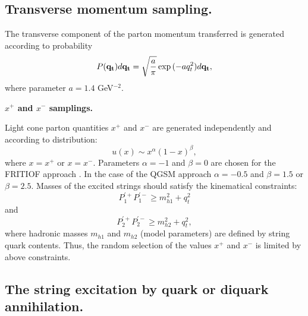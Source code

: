 \subsection{Transverse momentum sampling.}

\hspace{1.0em}The transverse component of the parton momentum
transferred is generated according to probability
\begin{equation}
\label{LSE4}P({\bf q_t})d{\bf q_t} = 
\sqrt{\frac{a}{\pi}} \exp{(-aq^2_t)}d{\bf q_t},
\end{equation}
where  parameter $a = 1.4$ GeV$^{-2}$.

{\bf $x^{+}$ and $x^{-}$ samplings.}

Light cone parton quantities $x^{+}$ and $x^{-}$ are generated
independently and according to distribution:
\begin{equation}
\label{LSE5} u(x) \sim x^{\alpha}(1 - x)^{\beta},
\end{equation}
where $x=x^{+}$ or $x=x^{-}$.
Parameters $\alpha =-1$ and $\beta = 0$ are chosen for the FRITIOF approach 
\cite{FRITIOF87}. In the case of the QGSM approach \cite{Am86} $\alpha = -0.5$ 
and $\beta = 1.5$ or $\beta = 2.5$.  Masses of the excited strings
should satisfy the kinematical constraints:
\begin{equation}
\label{LSE6} P^{\prime +}_1 P^{\prime -}_1 \geq m^2_{h1} + q^2_t
\end{equation}
and
\begin{equation}
\label{LSE7} P^{\prime +}_2 P^{\prime -}_2 \geq m^2_{h2} + q^2_t,
\end{equation}
where hadronic masses $m_{h1}$ and $m_{h2}$ (model parameters) are
defined by string quark contents.  Thus, the random selection of the
values $x^{+}$ and $x^{-}$ is limited by above constraints.

\subsection{The string excitation by quark or diquark annihilation.}

